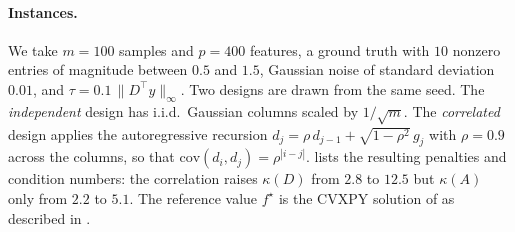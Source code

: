 \documentclass[11pt]{article}
\begin{document}
\paragraph{Instances.}
We take $m = 100$ samples and $p = 400$ features, a ground truth with $10$ nonzero entries of magnitude between $0.5$ and $1.5$, Gaussian noise of standard deviation $0.01$, and $\tau = 0.1\,\|D^\top y\|_\infty$.
Two designs are drawn from the same seed.
The \emph{independent} design has i.i.d.\ Gaussian columns scaled by $1/\sqrt{m}$.
The \emph{correlated} design applies the autoregressive recursion $d_j = \rho\, d_{j-1} + \sqrt{1 - \rho^2}\, g_j$ with $\rho = 0.9$ across the columns, so that $\mathrm{cov}(d_i, d_j) = \rho^{|i - j|}$.
 lists the resulting penalties and condition numbers: the correlation raises $\kappa(D)$ from $2.8$ to $12.5$ but $\kappa(A)$ only from $2.2$ to $5.1$.
The reference value $f^\star$ is the CVXPY solution of  as described in .
\begin{table}[htbp]
    \centering
    \caption{The two LASSO instances.
    Here $\kappa(A)$ is the condition number of the split constraint matrix $[D \;\; -I]$.}
    \label{tab:lasso-instances}
    
\end{table}
\end{document}
